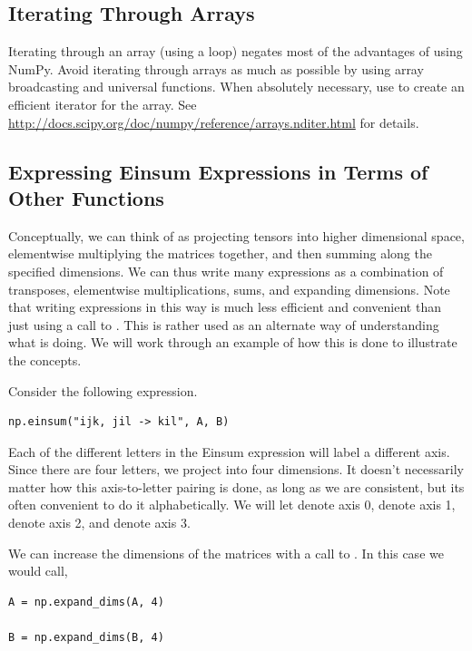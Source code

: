 \subsection*{Iterating Through Arrays} %

Iterating through an array (using a  loop) negates most of the advantages of using NumPy.
Avoid iterating through arrays as much as possible by using array broadcasting and universal functions.
When absolutely necessary, use  to create an efficient iterator for the array.
See \url{http://docs.scipy.org/doc/numpy/reference/arrays.nditer.html} for details.


\subsection*{Expressing Einsum Expressions in Terms of Other Functions} %

Conceptually, we can think of  as projecting tensors into higher dimensional space, elementwise multiplying the matrices together, and then summing along the specified dimensions.
We can thus write many  expressions as a combination of transposes, elementwise multiplications, sums, and expanding dimensions.
Note that writing  expressions in this way is much less efficient and convenient than just using a call to .
This is rather used as an alternate way of understanding what  is doing.
We will work through an example of how this is done to illustrate the concepts.

Consider the following  expression.

\begin{lstlisting}
np.einsum("ijk, jil -> kil", A, B)
\end{lstlisting}

Each of the different letters in the Einsum expression will label a different axis. Since there are four letters, we project into four dimensions.
It doesn't necessarily matter how this axis-to-letter pairing is done, as long as we are consistent, but its often convenient to do it alphabetically.
We will let  denote axis 0,  denote axis 1,  denote axis 2, and  denote axis 3.

We can increase the dimensions of the matrices with a call to . In this case we would call,

\begin{lstlisting}
A = np.expand_dims(A, 4)

B = np.expand_dims(B, 4)
\end{lstlisting}

